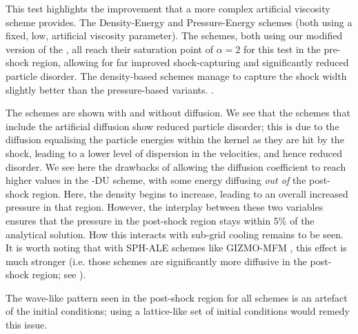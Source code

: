 This test highlights the improvement that a more complex artificial viscosity
scheme provides. The Density-Energy and Pressure-Energy schemes (both using a
\citet{Monaghan1992} fixed, low, artificial viscosity parameter). The \anarchy{}
schemes, both using our modified version of the \citet{Cullen2010}, all reach their
saturation point of $\alpha = 2$ for this test in the pre-shock region, allowing
for far improved shock-capturing and significantly reduced particle disorder.
The density-based schemes manage to capture the shock width slightly better than the
pressure-based variants. .

The \anarchy{} schemes are shown with and without diffusion. We see that the
schemes that include the artificial diffusion show reduced particle disorder;
this is due to the diffusion equalising the particle energies within the
kernel as they are hit by the shock, leading to a lower level of dispersion
in the velocities, and hence reduced disorder. We see here the drawbacks of
allowing the diffusion coefficient to reach higher values in the
\anarchy{}-DU scheme, with some energy diffusing \emph{out of} the post-shock
region. Here, the density begins to increase, leading to an overall increased
pressure in that region. However, the interplay between these two variables
ensures that the pressure in the post-shock region stays within 5\% of the
analytical solution. How this interacts with sub-grid cooling remains to
be seen.  It is worth noting that with SPH-ALE schemes like GIZMO-MFM \citep{Hopkins2015}, this
effect is much stronger (i.e. those schemes are significantly more diffusive
in the post-shock region; see ).

The wave-like pattern seen in the post-shock region for all schemes is an artefact
of the initial conditions; using a lattice-like set of initial conditions would
remedy this issue. 